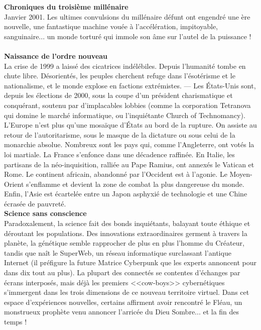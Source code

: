 \documentclass[11pt,twoside,a4paper]{book}
\begin{document}
\textbf{\LARGE Chroniques du troisi{\`e}me mill{\'e}naire} ~\\

Janvier 2001. Les ultimes convulsions du mill{\'e}naire d{\'e}funt ont engendr{\'e} une {\`e}re nouvelle, une fantastique machine vou{\'e}e {\`a} l'acc{\'e}l{\'e}ration, impitoyable, sanguinaire... un monde tortur{\'e} qui immole son {\^a}me sur l'autel de la puissance ! ~\\

\textbf{\large Naissance de l'ordre nouveau} ~\\

La crise de 1999 a laiss{\'e} des cicatrices ind{\'e}l{\'e}biles. Depuis l'humanit{\'e} tombe en chute libre. D{\'e}sorient{\'e}s, les peuples cherchent refuge dans l'{\'e}sot{\'e}risme et le nationalisme, et le monde explose en factions extr{\'e}mistes. --- Les {\'E}tats-Unis sont, depuis les {\'e}lections de 2000, sous la coupe d'un pr{\'e}sident charismatique et conqu{\'e}rant, soutenu par d'implacables lobbies (comme la corporation Tetranova qui domine le march{\'e} informatique, ou l'inqui{\'e}tante Church of Technomancy). L'Europe n'est plus qu'une mosa{\"i}que d'{\'E}tats au bord de la rupture. On assiste au retour de l'autoritarisme, sous le masque de la dictature ou sous celui de la monarchie absolue. Nombreux sont les pays qui, comme l'Angleterre, ont vot{\'e}s la loi martiale. La France s'enfonce dans une d{\'e}cadence raffin{\'e}e. En Italie, les partisans de la n{\'e}o-inquisition, ralli{\'e}e au Pape Ramius, ont annex{\'e}s le Vatican et Rome. Le continent africain, abandonn{\'e} par l'Occident est {\`a} l'agonie. Le Moyen-Orient s'enflamme et devient la zone de combat la plus dangereuse du monde. Enfin, l'Asie est {\'e}cartel{\'e}e entre un Japon asphyxi{\'e} de technologie et une Chine {\'e}cras{\'e}e de pauvret{\'e}. ~\\


\textbf{\large Science sans conscience} ~\\

Paradoxalement, la science fait des bonds inqui{\'e}tants, balayant toute {\'e}thique et d{\'e}routant les populations. Des innovations extraordinaires germent {\`a} travers la plan{\`e}te, la g{\'e}n{\'e}tique semble rapprocher de plus en plus l'homme du Cr{\'e}ateur, tandis que na{\^i}t le SuperWeb, un r{\'e}seau informatique surclassant l'antique Internet (il pr{\'e}figure la future Matrice Cyberpunk que les experts annoncent pour dans dix tout au plus). La plupart des connect{\'e}s se contentes d'{\'e}changes par {\'e}crans interpos{\'e}s, mais d{\'e}j{\`a} les premiers <<cow-boys>> cybern{\'e}tiques s'immergent dans les trois dimensions de ce nouveau territoire virtuel. Dans cet espace d'exp{\'e}riences nouvelles, certains affirment avoir rencontr{\'e} le Fl{\'e}au, un monstrueux proph{\`e}te venu annoncer l'arric{\'e}e du Dieu Sombre... et la fin des temps ! ~\\
\end{document}
